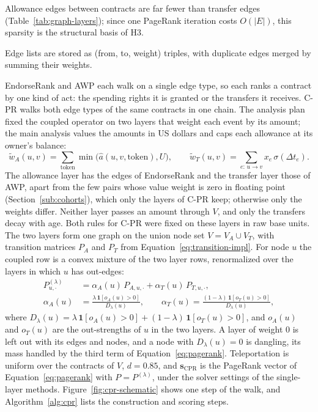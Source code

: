 Allowance edges between contracts are far fewer than transfer edges (Table~\ref{tab:graph-layers}); since one PageRank iteration costs $O(|E|)$, this sparsity is the structural basis of H3.

Edge lists are stored as (from, to, weight) triples, with duplicate edges merged by summing their weights.


EndorseRank and AWP each walk on a single edge type, so each ranks a contract by one kind of act: the spending rights it is granted or the transfers it receives. \mbox{C-PR} walks both edge types of the same contracts in one chain. The analysis plan fixed the coupled operator on two layers that weight each event by its amount; the main analysis values the amounts in US dollars and caps each allowance at its owner's balance:
\begin{equation}
\label{eq:raw-layers}
\tilde w_A(u,v)
=
\sum_{\mathrm{token}}
\min\bigl(\hat a(u,v,\mathrm{token}),U\bigr),
\qquad
\tilde w_T(u,v)
=
\sum_{e:\,u\to v}
x_e\,\sigma(\Delta t_e).
\end{equation}
The allowance layer has the edges of EndorseRank and the transfer layer those of AWP, apart from the few pairs whose value weight is zero in floating point (Section~\ref{sub:cohorts}), which only the layers of \mbox{C-PR} keep; otherwise only the weights differ. Neither layer passes an amount through $V$, and only the transfers decay with age. Both rules for \mbox{C-PR} were fixed on these layers in raw base units. The two layers form one graph on the union node set $V=V_A\cup V_T$, with transition matrices $P_A$ and $P_T$ from Equation~\eqref{eq:transition-impl}. For node $u$ the coupled row is a convex mixture of the two layer rows, renormalized over the layers in which $u$ has out-edges:
\begin{align}
P^{(\lambda)}_{u,\cdot}
&=
\alpha_A(u)\,P_{A,u,\cdot}+\alpha_T(u)\,P_{T,u,\cdot},
\label{eq:coupled-transition}\\
\alpha_A(u)
&=
\frac{\lambda\,\mathbf{1}[o_A(u)>0]}{D_{\lambda}(u)},
\qquad
\alpha_T(u)=\frac{(1-\lambda)\,\mathbf{1}[o_T(u)>0]}{D_{\lambda}(u)},
\nonumber
\end{align}
where $D_{\lambda}(u)=\lambda\,\mathbf{1}[o_A(u)>0]+(1-\lambda)\,\mathbf{1}[o_T(u)>0]$, and $o_A(u)$ and $o_T(u)$ are the out-strengths of $u$ in the two layers. A layer of weight $0$ is left out with its edges and nodes, and a node with $D_{\lambda}(u)=0$ is dangling, its mass handled by the third term of Equation~\eqref{eq:pagerank}. Teleportation is uniform over the contracts of $V$, $d=0.85$, and $\mathbf{s}_{\mathrm{CPR}}$ is the PageRank vector of Equation~\eqref{eq:pagerank} with $P=P^{(\lambda)}$, under the solver settings of the single-layer methods. Figure~\ref{fig:cpr-schematic} shows one step of the walk, and Algorithm~\ref{alg:cpr} lists the construction and scoring steps.

